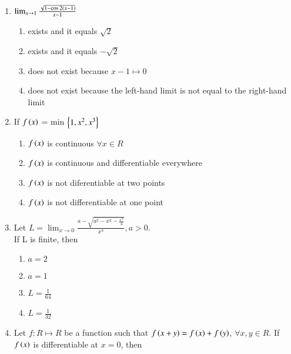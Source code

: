 \documentclass[journal,12pt,twocolumn]{IEEEtran}
\theoremstyle{remark}
\begin{document}
\begin{enumerate}
    \item 
    $\lim_{x \to1}\frac{\sqrt{1-\cos 2\left(x-1\right)}}{x-1}$ 

    \hfill 
    {}
    \begin{enumerate}[label=(\alph*)]
        
        \item exists and it equals $\sqrt{2}$
        \item exists and it equals $-\sqrt{2}$
        \item does not exist because $x-1\mapsto 0$
        \item does not exist because the left-hand limit is not equal to the right-hand limit
    \end{enumerate}


    \item 
    If $f\left(x\right)$ = min $\left\{1,x^2,x^3\right\}$ 

    \hfill 
    {}
    
    \begin{enumerate}[label=(\alph*)]
        
        \item $f\left(x\right)$ is continuous $\forall x \in R$
        \item $f\left(x\right)$ is continuous and differentiable everywhere
        \item $f\left(x\right)$ is not diferentiable at two points
        \item $f\left(x\right)$ is not differentiable at one point
    \end{enumerate}


    \item 
    Let $L=\lim_{x \to0}\frac{a-\sqrt{a^2-x^2-\frac{x^2}{4}}}{x^4}, a>0$.\\ If L is finite, then 

    \hfill 
    {}
    
    \begin{enumerate}[label=(\alph*)]
        
        \item $a=2$ 
        \item $a=1$
        \item $L=\frac{1}{64}$
        \item $L=\frac{1}{32}$
    \end{enumerate}


    \item 
    Let $f:R \mapsto R$ be a function such that $f\left(x+y\right)=f\left(x\right)+f\left(y\right)$, $\forall x,y\in R$. If $f\left(x\right)$ is differentiable at $x=0$, then 


\end{enumerate}
\end{document}
